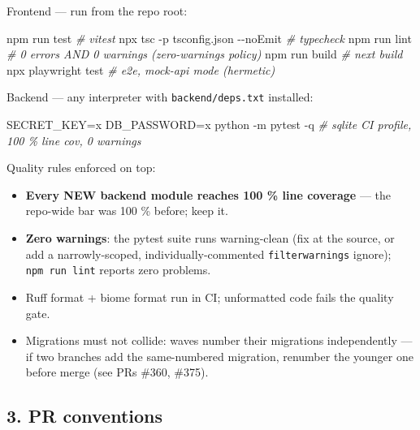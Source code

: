 \documentclass[
]{article}
\newenvironment{Shaded}{}{}
\newcommand{\AttributeTok}[1]{\textcolor[rgb]{0.49,0.56,0.16}{#1}}
\newcommand{\CommentTok}[1]{\textcolor[rgb]{0.38,0.63,0.69}{\textit{#1}}}
\newcommand{\ExtensionTok}[1]{#1}
\newcommand{\NormalTok}[1]{#1}
\newcommand{\OperatorTok}[1]{\textcolor[rgb]{0.40,0.40,0.40}{#1}}
\newcommand{\VariableTok}[1]{\textcolor[rgb]{0.10,0.09,0.49}{#1}}
\providecommand{\tightlist}{%
  \setlength{\itemsep}{0pt}\setlength{\parskip}{0pt}}
\begin{document}
Frontend --- run from the repo root:

\begin{Shaded}
\begin{Highlighting}[]
\ExtensionTok{npm}\NormalTok{ run test                      }\CommentTok{\# vitest}
\ExtensionTok{npx}\NormalTok{ tsc }\AttributeTok{{-}p}\NormalTok{ tsconfig.json }\AttributeTok{{-}{-}noEmit} \CommentTok{\# typecheck}
\ExtensionTok{npm}\NormalTok{ run lint                      }\CommentTok{\# 0 errors AND 0 warnings (zero{-}warnings policy)}
\ExtensionTok{npm}\NormalTok{ run build                     }\CommentTok{\# next build}
\ExtensionTok{npx}\NormalTok{ playwright test               }\CommentTok{\# e2e, mock{-}api mode (hermetic)}
\end{Highlighting}
\end{Shaded}

Backend --- any interpreter with \texttt{backend/deps.txt} installed:

\begin{Shaded}
\begin{Highlighting}[]
\VariableTok{SECRET\_KEY}\OperatorTok{=}\NormalTok{x }\VariableTok{DB\_PASSWORD}\OperatorTok{=}\NormalTok{x }\ExtensionTok{python} \AttributeTok{{-}m}\NormalTok{ pytest }\AttributeTok{{-}q}    \CommentTok{\# sqlite CI profile, 100 \% line cov, 0 warnings}
\end{Highlighting}
\end{Shaded}

Quality rules enforced on top:

\begin{itemize}
\tightlist
\item
  \textbf{Every NEW backend module reaches 100 \% line coverage} --- the
  repo-wide bar was 100 \% before; keep it.
\item
  \textbf{Zero warnings}: the pytest suite runs warning-clean (fix at
  the source, or add a narrowly-scoped, individually-commented
  \texttt{filterwarnings} ignore); \texttt{npm\ run\ lint} reports zero
  problems.
\item
  Ruff format + biome format run in CI; unformatted code fails the
  quality gate.
\item
  Migrations must not collide: waves number their migrations
  independently --- if two branches add the same-numbered migration,
  renumber the younger one before merge (see PRs \#360, \#375).
\end{itemize}

\subsection{3. PR conventions}\label{3-pr-conventions}
\end{document}
